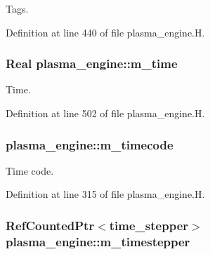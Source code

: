 Tags. 



Definition at line 440 of file plasma\+\_\+engine.\+H.

\subsubsection[{\texorpdfstring{m\+\_\+time}{m_time}}]{\setlength{\rightskip}{0pt plus 5cm}Real plasma\+\_\+engine\+::m\+\_\+time\hspace{0.3cm}{\ttfamily [protected]}}\hypertarget{classplasma__engine_a6b74f07948066166ac42b087b2fa3fba}{}\label{classplasma__engine_a6b74f07948066166ac42b087b2fa3fba}


Time. 



Definition at line 502 of file plasma\+\_\+engine.\+H.

\subsubsection[{\texorpdfstring{m\+\_\+timecode}{m_timecode}}]{ plasma\+\_\+engine\+::m\+\_\+timecode\hspace{0.3cm}{\ttfamily [protected]}}\hypertarget{classplasma__engine_a0dafd26d0f8608c5f17148817a75a004}{}\label{classplasma__engine_a0dafd26d0f8608c5f17148817a75a004}


Time code. 



Definition at line 315 of file plasma\+\_\+engine.\+H.

\subsubsection[{\texorpdfstring{m\+\_\+timestepper}{m_timestepper}}]{\setlength{\rightskip}{0pt plus 5cm}Ref\+Counted\+Ptr$<${\bf time\+\_\+stepper}$>$ plasma\+\_\+engine\+::m\+\_\+timestepper\hspace{0.3cm}{\ttfamily [protected]}}\hypertarget{classplasma__engine_a1ddf5178d9bd09d9844e0c8c7486e9b3}{}\label{classplasma__engine_a1ddf5178d9bd09d9844e0c8c7486e9b3}


